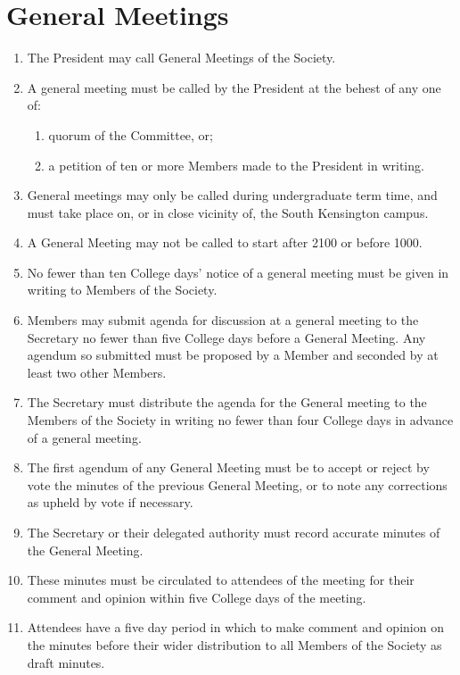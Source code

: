 \documentclass[a4paper]{tufte-handout}
\newcommand{\policyOffset}{12pt}
\newcommand{\policyCspp}[2][\policyOffset]{\marginnote[#1]{\textsc{CSP Policy \S#2}}}
\begin{document}
\section{General Meetings}
\begin{enumerate}[resume]
    \item The President may call General Meetings of the Society.
    \item \policyCspp{74} A general meeting must be called by the President at the behest of any one of:
        \begin{enumerate}
            \item quorum of the Committee, or;
            \item a petition of ten or more Members made to the President in writing.
        \end{enumerate}
    \item General meetings may only be called during undergraduate term time, and must take place on, or in close vicinity of, the South Kensington campus.
    \item A General Meeting may not be called to start after 2100 or before 1000.
    \item No fewer than ten College days' notice of a general meeting must be given in writing to Members of the Society.
    \item Members may submit agenda for discussion at a general meeting to the Secretary no fewer than five College days before a General Meeting. Any agendum so submitted must be proposed by a Member and seconded by at least two other Members.
    \item The Secretary must distribute the agenda for the General meeting to the Members of the Society in writing no fewer than four College days in advance of a general meeting.
    \item The first agendum of any General Meeting must be to accept or reject by vote the minutes of the previous General Meeting, or to note any corrections as upheld by vote if necessary.
    \item The Secretary or their delegated authority must record accurate minutes of the General Meeting.
    \item These minutes must be circulated to attendees of the meeting for their comment and opinion within five College days of the meeting.
    \item Attendees have a five day period in which to make comment and opinion on the minutes before their wider distribution to all Members of the Society as draft minutes.

\end{enumerate}
\end{document}
